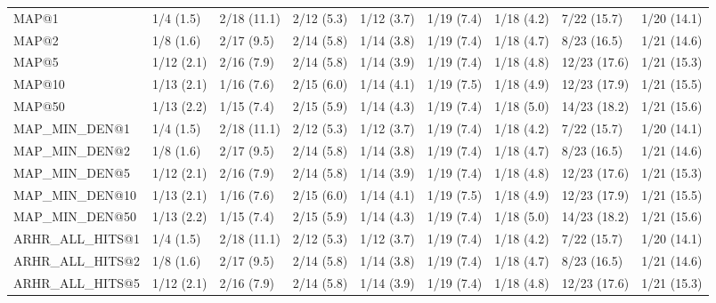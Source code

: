 \begin{tabular}{lllllllll}
MAP@1                       &      1/4 (1.5) &    2/18 (11.1) &    2/12 (5.3) &    1/12 (3.7) &  1/19 (7.4) &   1/18 (4.2) &    7/22 (15.7) &        1/20 (14.1) \\
MAP@2                       &      1/8 (1.6) &     2/17 (9.5) &    2/14 (5.8) &    1/14 (3.8) &  1/19 (7.4) &   1/18 (4.7) &    8/23 (16.5) &        1/21 (14.6) \\
MAP@5                       &     1/12 (2.1) &     2/16 (7.9) &    2/14 (5.8) &    1/14 (3.9) &  1/19 (7.4) &   1/18 (4.8) &   12/23 (17.6) &        1/21 (15.3) \\
MAP@10                      &     1/13 (2.1) &     1/16 (7.6) &    2/15 (6.0) &    1/14 (4.1) &  1/19 (7.5) &   1/18 (4.9) &   12/23 (17.9) &        1/21 (15.5) \\
MAP@50                      &     1/13 (2.2) &     1/15 (7.4) &    2/15 (5.9) &    1/14 (4.3) &  1/19 (7.4) &   1/18 (5.0) &   14/23 (18.2) &        1/21 (15.6) \\
MAP_MIN_DEN@1               &      1/4 (1.5) &    2/18 (11.1) &    2/12 (5.3) &    1/12 (3.7) &  1/19 (7.4) &   1/18 (4.2) &    7/22 (15.7) &        1/20 (14.1) \\
MAP_MIN_DEN@2               &      1/8 (1.6) &     2/17 (9.5) &    2/14 (5.8) &    1/14 (3.8) &  1/19 (7.4) &   1/18 (4.7) &    8/23 (16.5) &        1/21 (14.6) \\
MAP_MIN_DEN@5               &     1/12 (2.1) &     2/16 (7.9) &    2/14 (5.8) &    1/14 (3.9) &  1/19 (7.4) &   1/18 (4.8) &   12/23 (17.6) &        1/21 (15.3) \\
MAP_MIN_DEN@10              &     1/13 (2.1) &     1/16 (7.6) &    2/15 (6.0) &    1/14 (4.1) &  1/19 (7.5) &   1/18 (4.9) &   12/23 (17.9) &        1/21 (15.5) \\
MAP_MIN_DEN@50              &     1/13 (2.2) &     1/15 (7.4) &    2/15 (5.9) &    1/14 (4.3) &  1/19 (7.4) &   1/18 (5.0) &   14/23 (18.2) &        1/21 (15.6) \\
ARHR_ALL_HITS@1             &      1/4 (1.5) &    2/18 (11.1) &    2/12 (5.3) &    1/12 (3.7) &  1/19 (7.4) &   1/18 (4.2) &    7/22 (15.7) &        1/20 (14.1) \\
ARHR_ALL_HITS@2             &      1/8 (1.6) &     2/17 (9.5) &    2/14 (5.8) &    1/14 (3.8) &  1/19 (7.4) &   1/18 (4.7) &    8/23 (16.5) &        1/21 (14.6) \\
ARHR_ALL_HITS@5             &     1/12 (2.1) &     2/16 (7.9) &    2/14 (5.8) &    1/14 (3.9) &  1/19 (7.4) &   1/18 (4.8) &   12/23 (17.6) &        1/21 (15.3) \\

\end{tabular}
